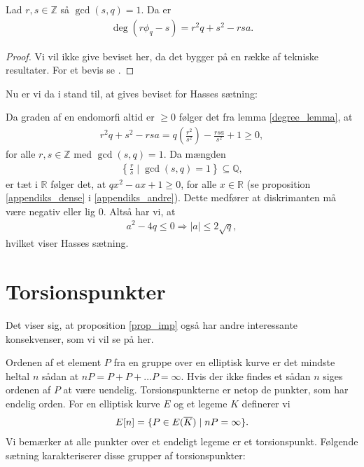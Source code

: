 \begin{lemma}
\label{degree_lemma}
Lad $r, s \in \mathbb{Z}$ så $\gcd(s, q) = 1$. Da er 
\begin{align*}
	\deg(r \phi_q - s) = r^2 q + s^2 - rsa.
\end{align*}
\end{lemma}
\begin{proof}
Vi vil ikke give beviset her, da det bygger på en række af tekniske resultater. For et bevis se \cite[s.~100]{Washington}.
\end{proof}

Nu er vi da i stand til, at gives beviset for Hasses sætning:

\begin{proofof}
Da graden af en endomorfi altid er $\geq 0$ følger det fra lemma \ref{degree_lemma}, at 
\begin{align*}
	r^2q+s^2 -rsa = q \left( \frac{r^2}{s^2} \right) - \frac{rsa}{s^2} + 1 
	\geq 0,
\end{align*}
for alle $r, s \in \mathbb{Z}$ med $\gcd(s, q)=1$. Da mængden
\begin{align*}
	\left\{ \frac{r}{s} \mid \gcd(s, q)=1 \right\} \subseteq \mathbb{Q},
\end{align*}
er tæt i $\mathbb{R}$ følger det, at $qx^2 - ax + 1 \geq 0$,
for alle $x \in \mathbb{R}$ (se proposition \ref{appendiks_dense} i \ref{appendiks_andre}). Dette medfører at diskrimanten må være negativ eller lig $0$.
Altså har vi, at 
\begin{align*}
	a^2 - 4q \leq 0 \Rightarrow |a| \leq 2 \sqrt{q},
\end{align*}
hvilket viser Hasses sætning.
\end{proofof}

\section{Torsionspunkter}
Det viser sig, at proposition \ref{prop_imp} også har andre interessante konsekvenser, som vi vil se på her. 

Ordenen af et element $P$ fra en gruppe over en elliptisk kurve er det mindste heltal $n$ sådan at 
$nP = P + P + \ldots P = \infty$. Hvis der ikke findes et sådan $n$ siges ordenen af $P$ at være uendelig. Torsionspunkterne er netop de punkter, som har endelig orden. For en elliptisk kurve $E$ og et legeme $K$ definerer vi
\begin{align*}
	E[n] = \{ P \in E(\overline{K}) \mid nP= \infty \}.
\end{align*}
Vi bemærker at alle punkter over et endeligt legeme er et torsionspunkt. Følgende sætning karakteriserer disse grupper af torsionspunkter:

